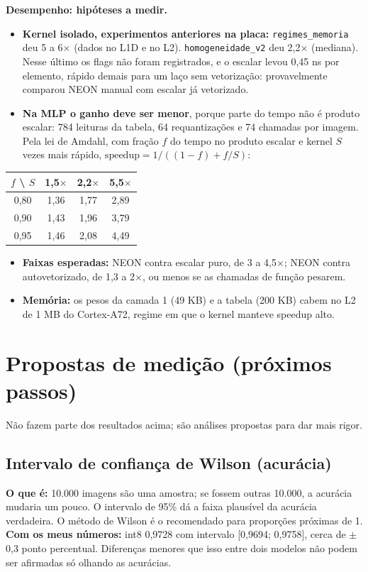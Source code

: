 \documentclass[10pt]{article}
\begin{document}
\textbf{Desempenho: hipóteses a medir.}
\begin{itemize}
\item \textbf{Kernel isolado, experimentos anteriores na placa:} \texttt{regimes\_memoria} deu 5 a 6$\times$
      (dados no L1D e no L2). \texttt{homogeneidade\_v2} deu 2,2$\times$ (mediana). Nesse último os flags
      não foram registrados, e o escalar levou 0,45 ns por elemento, rápido demais para um laço sem
      vetorização: provavelmente comparou NEON manual com escalar já vetorizado.
\item \textbf{Na MLP o ganho deve ser menor}, porque parte do tempo não é produto escalar: 784 leituras
      da tabela, 64 requantizações e 74 chamadas por imagem. Pela lei de Amdahl, com fração $f$ do
      tempo no produto escalar e kernel $S$ vezes mais rápido, $\text{speedup} = 1/((1-f)+f/S)$:
\end{itemize}
\begin{center}\footnotesize
\begin{tabular}{@{}cccc@{}}
\toprule
$f$ \textbackslash{} $S$ & 1,5$\times$ & 2,2$\times$ & 5,5$\times$ \\
\midrule
0,80 & 1,36 & 1,77 & 2,89 \\
0,90 & 1,43 & 1,96 & 3,79 \\
0,95 & 1,46 & 2,08 & 4,49 \\
\bottomrule
\end{tabular}
\end{center}
\begin{itemize}
\item \textbf{Faixas esperadas:} NEON contra escalar puro, de 3 a 4,5$\times$; NEON contra autovetorizado,
      de 1,3 a 2$\times$, ou menos se as chamadas de função pesarem.
\item \textbf{Memória:} os pesos da camada 1 (49 KB) e a tabela (200 KB) cabem no L2 de 1 MB do
      Cortex-A72, regime em que o kernel manteve speedup alto.
\end{itemize}

\section{Propostas de medição (próximos passos)}

Não fazem parte dos resultados acima; são análises propostas para dar mais rigor.

\subsection{Intervalo de confiança de Wilson (acurácia)}
\textbf{O que é:} 10.000 imagens são uma amostra; se fossem outras 10.000, a acurácia mudaria um
pouco. O intervalo de 95\% dá a faixa plausível da acurácia verdadeira. O método de Wilson é o
recomendado para proporções próximas de 1.\\
\textbf{Com os meus números:} int8 0,9728 com intervalo [0,9694; 0,9758], cerca de $\pm$0,3 ponto
percentual. Diferenças menores que isso entre dois modelos não podem ser afirmadas só olhando as
acurácias.
\end{document}
